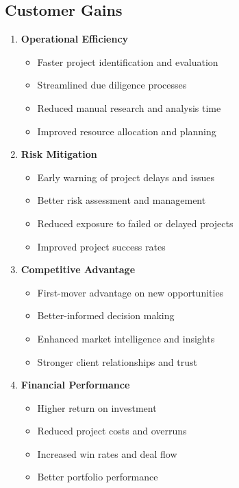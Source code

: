 \documentclass[business]{../templates/infraradar-main}
\begin{document}
\subsection{Customer Gains}
\begin{enumerate}
    \item \textbf{Operational Efficiency}
    \begin{itemize}
        \item Faster project identification and evaluation
        \item Streamlined due diligence processes
        \item Reduced manual research and analysis time
        \item Improved resource allocation and planning
    \end{itemize}
    
    \item \textbf{Risk Mitigation}
    \begin{itemize}
        \item Early warning of project delays and issues
        \item Better risk assessment and management
        \item Reduced exposure to failed or delayed projects
        \item Improved project success rates
    \end{itemize}
    
    \item \textbf{Competitive Advantage}
    \begin{itemize}
        \item First-mover advantage on new opportunities
        \item Better-informed decision making
        \item Enhanced market intelligence and insights
        \item Stronger client relationships and trust
    \end{itemize}
    
    \item \textbf{Financial Performance}
    \begin{itemize}
        \item Higher return on investment
        \item Reduced project costs and overruns
        \item Increased win rates and deal flow
        \item Better portfolio performance
    \end{itemize}
\end{enumerate}
\end{document}
